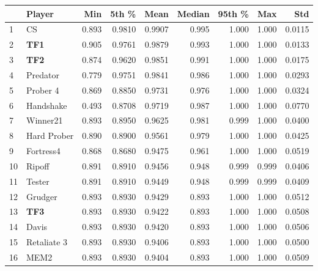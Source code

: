 \begin{tabular}{llrrrrrrr}
\toprule
{} &       Player &    Min &   5th \% &    Mean &  Median &  95th \% &    Max &     Std \\
\midrule
1  &           CS &  0.893 &  0.9810 &  0.9907 &   0.995 &   1.000 &  1.000 &  0.0115 \\
2  &          \textbf{TF1} &  0.905 &  0.9761 &  0.9879 &   0.993 &   1.000 &  1.000 &  0.0133 \\
3  &          \textbf{TF2} &  0.874 &  0.9620 &  0.9851 &   0.991 &   1.000 &  1.000 &  0.0175 \\
4  &     Predator &  0.779 &  0.9751 &  0.9841 &   0.986 &   1.000 &  1.000 &  0.0293 \\
5  &     Prober 4 &  0.869 &  0.8850 &  0.9731 &   0.976 &   1.000 &  1.000 &  0.0324 \\
6  &    Handshake &  0.493 &  0.8708 &  0.9719 &   0.987 &   1.000 &  1.000 &  0.0770 \\
7  &     Winner21 &  0.893 &  0.8950 &  0.9625 &   0.981 &   0.999 &  1.000 &  0.0400 \\
8  &  Hard Prober &  0.890 &  0.8900 &  0.9561 &   0.979 &   1.000 &  1.000 &  0.0425 \\
9  &    Fortress4 &  0.868 &  0.8680 &  0.9475 &   0.961 &   1.000 &  1.000 &  0.0519 \\
10 &       Ripoff &  0.891 &  0.8910 &  0.9456 &   0.948 &   0.999 &  0.999 &  0.0406 \\
11 &       Tester &  0.891 &  0.8910 &  0.9449 &   0.948 &   0.999 &  0.999 &  0.0409 \\
12 &      Grudger &  0.893 &  0.8930 &  0.9429 &   0.893 &   1.000 &  1.000 &  0.0512 \\
13 &          \textbf{TF3} &  0.893 &  0.8930 &  0.9422 &   0.893 &   1.000 &  1.000 &  0.0508 \\
14 &        Davis &  0.893 &  0.8930 &  0.9420 &   0.893 &   1.000 &  1.000 &  0.0506 \\
15 &  Retaliate 3 &  0.893 &  0.8930 &  0.9406 &   0.893 &   1.000 &  1.000 &  0.0500 \\
16 &         MEM2 &  0.893 &  0.8930 &  0.9404 &   0.893 &   1.000 &  1.000 &  0.0509 \\
\bottomrule
\end{tabular}
